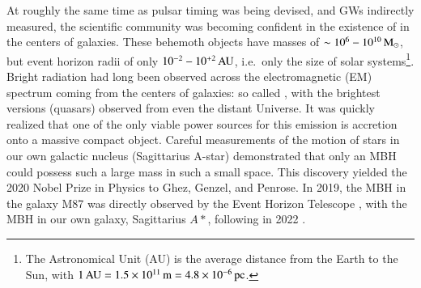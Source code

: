 \documentclass[onecolumn,authoryear]{els-mrw}
\begin{document}
At roughly the same time as pulsar timing was being devised, and GWs indirectly measured, the scientific community was becoming confident in the existence of  in the centers of galaxies.  These behemoth objects have masses of $\sim 10^6 - 10^{10} \, \textrm{M}_{\odot}$, but event horizon radii of only $10^{-2} - 10^{+2} \, \textrm{AU}$, i.e.~only the size of solar systems\footnote{The Astronomical Unit (AU) is the average distance from the Earth to the Sun, with $1 \, \textrm{AU} = 1.5\times\nobreak10^{11} \, \textrm{m} = 4.8\times\nobreak10^{-6} \, \mathrm{pc}$.}.  Bright radiation had long been observed across the electromagnetic (EM) spectrum coming from the centers of galaxies: so called , with the brightest versions (quasars) observed from even the distant Universe.  It was quickly realized that one of the only viable power sources for this emission is accretion onto a massive compact object.
Careful measurements of the motion of stars in our own galactic nucleus (Sagittarius A-star) demonstrated that only an MBH could possess such a large mass in such a small space.  This discovery yielded the 2020 Nobel Prize in Physics to Ghez, Genzel, and Penrose.  In 2019, the MBH in the galaxy M87 was directly observed by the Event Horizon Telescope \citep{EHT-2019}, with the MBH in our own galaxy, Sagittarius $A*$, following in 2022 \citep{EHT-2022}.
\end{document}
